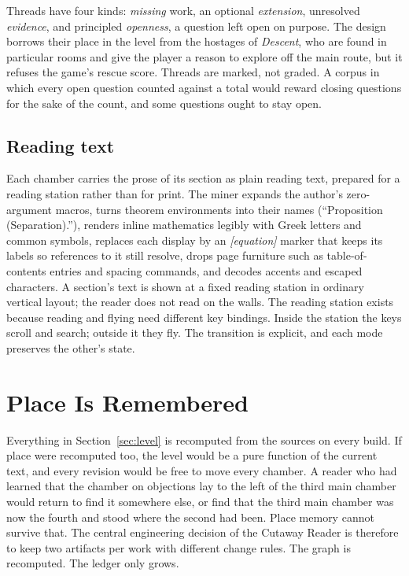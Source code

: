 \documentclass[11pt]{article}
\theoremstyle{remark}
\begin{document}
Threads have four kinds: \emph{missing} work, an optional \emph{extension}, unresolved \emph{evidence}, and principled \emph{openness}, a question left open on purpose. The design borrows their place in the level from the hostages of \emph{Descent}, who are found in particular rooms and give the player a reason to explore off the main route, but it refuses the game's rescue score. Threads are marked, not graded. A corpus in which every open question counted against a total would reward closing questions for the sake of the count, and some questions ought to stay open.

\subsection{Reading text}

Each chamber carries the prose of its section as plain reading text, prepared for a reading station rather than for print. The miner expands the author's zero-argument macros, turns theorem environments into their names (``Proposition (Separation).''), renders inline mathematics legibly with Greek letters and common symbols, replaces each display by an \emph{[equation]} marker that keeps its labels so references to it still resolve, drops page furniture such as table-of-contents entries and spacing commands, and decodes accents and escaped characters. A section's text is shown at a fixed reading station in ordinary vertical layout; the reader does not read on the walls. The reading station exists because reading and flying need different key bindings. Inside the station the keys scroll and search; outside it they fly. The transition is explicit, and each mode preserves the other's state.

\section{Place Is Remembered}
\label{sec:ledger}

Everything in Section~\ref{sec:level} is recomputed from the sources on every build. If place were recomputed too, the level would be a pure function of the current text, and every revision would be free to move every chamber. A reader who had learned that the chamber on objections lay to the left of the third main chamber would return to find it somewhere else, or find that the third main chamber was now the fourth and stood where the second had been. Place memory cannot survive that. The central engineering decision of the Cutaway Reader is therefore to keep two artifacts per work with different change rules. The graph is recomputed. The ledger only grows.
\end{document}
